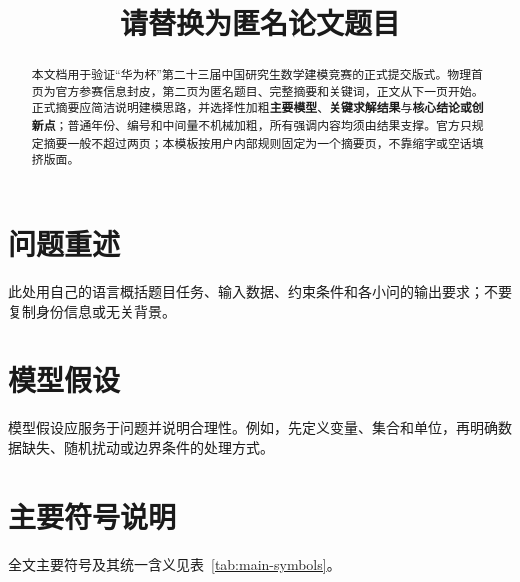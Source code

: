 \documentclass[bwprint]{gmcmthesis}
\title{请替换为匿名论文题目}
\begin{document}
\makeidentitycover
\maketitle

\begin{abstract}
本文档用于验证“华为杯”第二十三届中国研究生数学建模竞赛的正式提交版式。物理首页为官方参赛信息封皮，第二页为匿名题目、完整摘要和关键词，正文从下一页开始。正式摘要应简洁说明建模思路，并选择性加粗\textbf{主要模型}、\textbf{关键求解结果}与\textbf{核心结论或创新点}；普通年份、编号和中间量不机械加粗，所有强调内容均须由结果支撑。官方只规定摘要一般不超过两页；本模板按用户内部规则固定为一个摘要页，不靠缩字或空话填挤版面。

\end{abstract}

\section{问题重述}
此处用自己的语言概括题目任务、输入数据、约束条件和各小问的输出要求；不要复制身份信息或无关背景。


\section{模型假设}
模型假设应服务于问题并说明合理性。例如，先定义变量、集合和单位，再明确数据缺失、随机扰动或边界条件的处理方式。

\section{主要符号说明}
全文主要符号及其统一含义见表~\ref{tab:main-symbols}。
\end{document}
